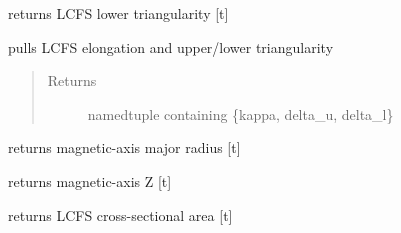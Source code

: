 \documentclass[letterpaper,10pt,english]{sphinxmanual}
\begin{document}
\begin{fulllineitems}
\begin{fulllineitems}
\end{fulllineitems}


\begin{fulllineitems}
\label{eqtools:eqtools.EFIT.EFITTree.getLowerTriangularity}
returns LCFS lower triangularity {[}t{]}

\end{fulllineitems}


\begin{fulllineitems}
\label{eqtools:eqtools.EFIT.EFITTree.getShaping}
pulls LCFS elongation and upper/lower triangularity
\begin{quote}\begin{description}
\item[{Returns}] \leavevmode
namedtuple containing \{kappa, delta\_u, delta\_l\}

\end{description}\end{quote}

\end{fulllineitems}


\begin{fulllineitems}
\label{eqtools:eqtools.EFIT.EFITTree.getMagR}
returns magnetic-axis major radius {[}t{]}

\end{fulllineitems}


\begin{fulllineitems}
\label{eqtools:eqtools.EFIT.EFITTree.getMagZ}
returns magnetic-axis Z {[}t{]}

\end{fulllineitems}


\begin{fulllineitems}
\label{eqtools:eqtools.EFIT.EFITTree.getAreaLCFS}
returns LCFS cross-sectional area {[}t{]}


\end{fulllineitems}
\end{fulllineitems}
\end{document}
